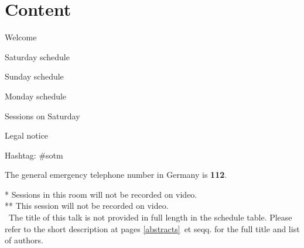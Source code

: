\section*{Content}
\newlength\contentspace
\setlength\contentspace{\contentspace}

\vspace*{\contentspace}%
\noindent Welcome\dotfill \pageref{welcome}
%
%
%

\vspace*{\contentspace}%
\noindent Saturday schedule \dotfill \pageref{saturday}

\vspace*{\contentspace}%
\noindent Sunday schedule \dotfill \pageref{sunday}

\vspace*{\contentspace}%
\noindent Monday schedule \dotfill \pageref{monday}

\vspace*{\contentspace}%
\noindent Sessions on Saturday \dotfill \pageref{saturday-descriptions}
%
%
%

\vspace*{\contentspace}%
\noindent Legal notice \dotfill \pageref{legal}

\vfill
\noindent
Hashtag: \#sotm

\vspace*{0.8em}%
\noindent
The general emergency telephone number in Germany is \textbf{112}.
\vfill

\small{
\noindent
  \** Sessions in this room will not be recorded on video.\\
  \**\** This session will not be recorded on video.\\
  \diamondSymbol\ The title of this talk is not provided in full length in the schedule table. Please refer to the short description at pages \ref{abstracts}~et seqq. for the full title and list of authors.
}\normalsize


\newpage
